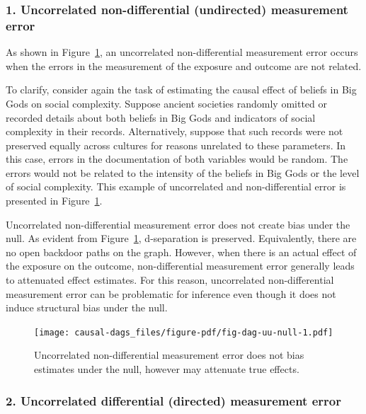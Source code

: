 \documentclass[
  singlecolumn]{article}
\begin{document}
\hypertarget{uncorrelated-non-differential-undirected-measurement-error}{%
\subsubsection{1. Uncorrelated non-differential (undirected) measurement
error}\label{uncorrelated-non-differential-undirected-measurement-error}}

As shown in Figure~\ref{fig-dag-uu-null}, an uncorrelated
non-differential measurement error occurs when the errors in the
measurement of the exposure and outcome are not related.

To clarify, consider again the task of estimating the causal effect of
beliefs in Big Gods on social complexity. Suppose ancient societies
randomly omitted or recorded details about both beliefs in Big Gods and
indicators of social complexity in their records. Alternatively, suppose
that such records were not preserved equally across cultures for reasons
unrelated to these parameters. In this case, errors in the documentation
of both variables would be random. The errors would not be related to
the intensity of the beliefs in Big Gods or the level of social
complexity. This example of uncorrelated and non-differential error is
presented in Figure~\ref{fig-dag-uu-null}.

Uncorrelated non-differential measurement error does not create bias
under the null. As evident from Figure~\ref{fig-dag-uu-null},
d-separation is preserved. Equivalently, there are no open backdoor
paths on the graph. However, when there is an actual effect of the
exposure on the outcome, non-differential measurement error generally
leads to attenuated effect estimates. For this reason, uncorrelated
non-differential measurement error can be problematic for inference even
though it does not induce structural bias under the null.

\begin{figure}

{\centering \texttt{[image: causal-dags\_files/figure-pdf/fig-dag-uu-null-1.pdf]}

}

\caption{\label{fig-dag-uu-null}Uncorrelated non-differential
measurement error does not bias estimates under the null, however may
attenuate true effects.}

\end{figure}

\hypertarget{uncorrelated-differential-directed-measurement-error}{%
\subsubsection{2. Uncorrelated differential (directed) measurement
error}\label{uncorrelated-differential-directed-measurement-error}}
\end{document}
